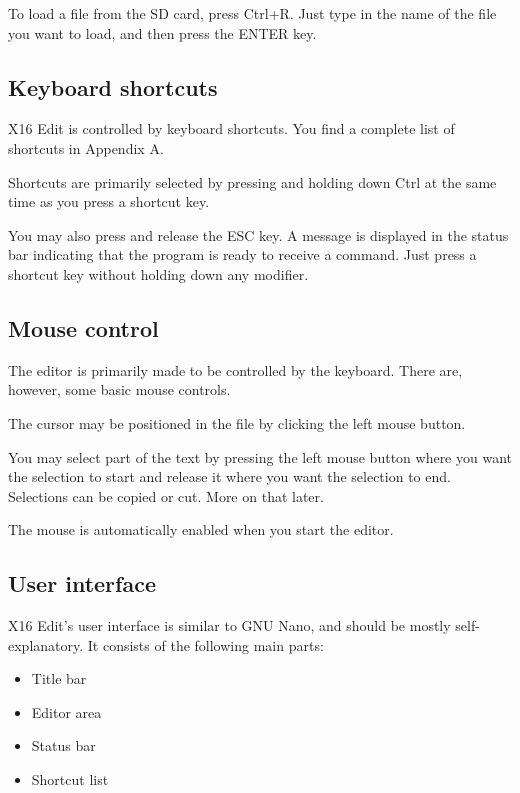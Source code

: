 \documentclass{article}
\begin{document}
        To load a file from the SD card, press Ctrl+R. 
        Just type in the name of the file you want to load, and then press the ENTER key.
        
    \subsection{Keyboard shortcuts}
        X16 Edit is controlled by keyboard shortcuts. You find a complete list
        of shortcuts in Appendix A.

        Shortcuts are primarily selected by pressing and holding down Ctrl at the
        same time as you press a shortcut key.

        You may also press and release the ESC key. A message is displayed
        in the status bar indicating that the program is ready to receive a command.
        Just press a shortcut key without holding down any modifier.

    \subsection{Mouse control}
        The editor is primarily made to be controlled by the keyboard. There are, however,
        some basic mouse controls.

        The cursor may be positioned in the file by clicking the left mouse button.

        You may select part of the text by pressing the left mouse button where
        you want the selection to start and release it where you want the selection to end. 
        Selections can be copied or cut. More on that later.

        The mouse is automatically enabled when you start the editor.
    
    \subsection{User interface}
        X16 Edit's user interface is similar to GNU Nano, and should be mostly self-explanatory.
        It consists of the following main parts:

        \begin{itemize}
            \item Title bar
            \item Editor area
            \item Status bar
            \item Shortcut list
        \end{itemize}
\end{document}
